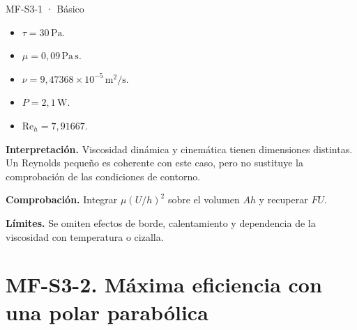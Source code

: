 \begin{studiumworked}{MF-S3-1 · Básico}
\begin{itemize}
\item $\tau=30\,\mathrm{Pa}$.

\item $\mu=0{,}09\,\mathrm{Pa\,s}$.

\item $\nu=9{,}47368\times10^{-5}\,\mathrm{m^2/s}$.

\item $P=2{,}1\,\mathrm{W}$.

\item $\mathrm{Re}_h=7{,}91667$.

\end{itemize}

\textbf{Interpretación.} Viscosidad dinámica y cinemática tienen dimensiones distintas. Un Reynolds pequeño es coherente con este caso, pero no sustituye la comprobación de las condiciones de contorno.

\textbf{Comprobación.} Integrar $\mu(U/h)^2$ sobre el volumen $Ah$ y recuperar $FU$.

\textbf{Límites.} Se omiten efectos de borde, calentamiento y dependencia de la viscosidad con temperatura o cizalla.

\end{studiumworked}

\Needspace{.30\textheight}\section{MF-S3-2. Máxima eficiencia con una polar parabólica}


